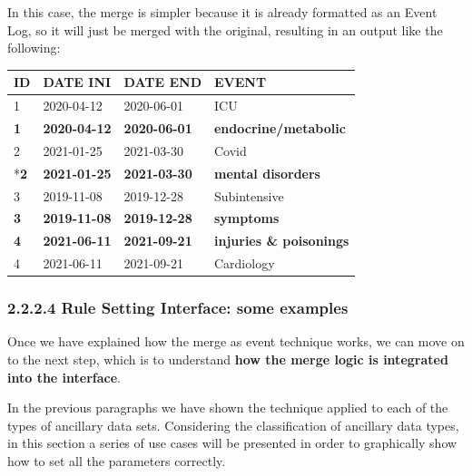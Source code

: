 \documentclass[
]{book}
\begin{document}
In this case, the merge is simpler because it is already formatted as an Event Log, so it will just be merged with the original, resulting in an output like the following:

\begin{longtable}[]{@{}llll@{}}
\toprule
ID & DATE INI & DATE END & EVENT \\
\midrule
\endhead
1 & 2020-04-12 & 2020-06-01 & ICU \\
\textbf{1} & \textbf{2020-04-12} & \textbf{2020-06-01} & \textbf{endocrine/metabolic} \\
2 & 2021-01-25 & 2021-03-30 & Covid \\
*\textbf{2} & \textbf{2021-01-25} & \textbf{2021-03-30} & \textbf{mental disorders} \\
3 & 2019-11-08 & 2019-12-28 & Subintensive \\
\textbf{3} & \textbf{2019-11-08} & \textbf{2019-12-28} & \textbf{symptoms} \\
\textbf{4} & \textbf{2021-06-11} & \textbf{2021-09-21} & \textbf{injuries \& poisonings} \\
4 & 2021-06-11 & 2021-09-21 & Cardiology \\
\bottomrule
\end{longtable}

\hypertarget{rule-setting-interface-some-examples}{%
\subsubsection{2.2.2.4 Rule Setting Interface: some examples}\label{rule-setting-interface-some-examples}}

Once we have explained how the merge as event technique works, we can move on to the next step, which is to understand \textbf{how the merge logic is integrated into the interface}.

In the previous paragraphs we have shown the technique applied to each of the types of ancillary data sets. Considering the classification of ancillary data types, in this section a series of use cases will be presented in order to graphically show how to set all the parameters correctly.
\end{document}
